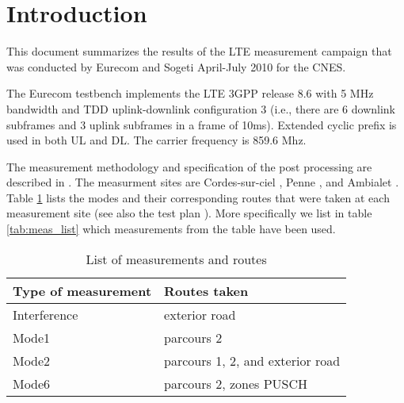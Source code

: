 \documentclass[a4paper,10pt]{article}
\begin{document}

\section{Introduction}

This document summarizes the results of the LTE measurement campaign that was conducted by Eurecom and Sogeti April-July 2010 for the CNES.

The Eurecom testbench implements the LTE 3GPP release 8.6 \cite{3GPPTS36.211,3GPPTS36.212,3GPPTS36.213} with 5 MHz bandwidth and TDD uplink-downlink configuration 3 (i.e., there are 6 downlink subframes and 3 uplink subframes in a frame of 10ms). Extended cyclic prefix is used in both UL and DL. The carrier frequency is 859.6 Mhz. 
 
The measurement methodology and specification of the post processing are described in \cite{measurements_spec}. The measurment sites are Cordes-sur-ciel \cite{cordes_desc}, Penne \cite{penne_desc}, and Ambialet \cite{ambialet_desc}. Table \ref{tab:meas} lists the modes and their corresponding routes that were taken at each  measurement site (see also the test plan \cite{test_plan}). More specifically we list in table \ref{tab:meas_list} which measurements from the table \cite{measurements_spreadsheet} have been used.


\begin{table}
\centering
\begin{tabular}{l|p{6cm}}
Type of measurement & Routes taken \\ 
\hline
Interference & exterior road \\ 
Mode1 & parcours 2 \\ 
Mode2 & parcours 1, 2, and exterior road \\ 
Mode6 & parcours 2, zones PUSCH \\ 
\end{tabular}
\caption{List of measurements and routes}
\label{tab:meas}
\end{table}
\end{document}
